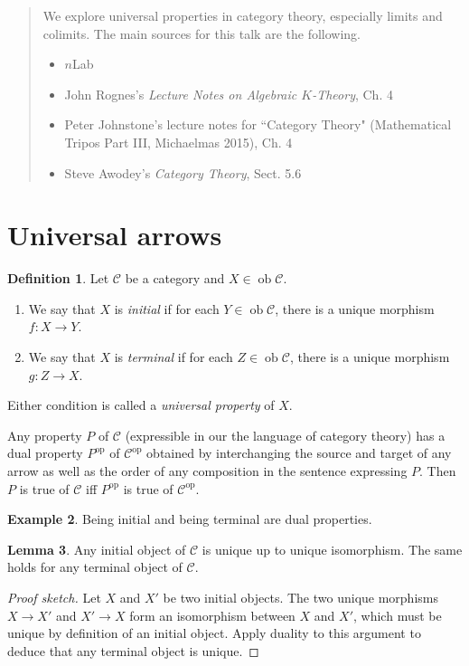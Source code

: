 \documentclass[10pt,letterpaper,cm]{nupset}
\theoremstyle{definition}
\newtheorem{definition}{Definition}[section]
\newtheorem{exmp}[definition]{Example}
\theoremstyle{theorem}
\newtheorem{lemma}[definition]{Lemma}
\theoremstyle{remark}
\newcommand{\1}{\mathbf{1}}
\renewcommand{\c}{\mathscr{C}}
\newcommand{\0}{\vec 0}
\DeclareMathOperator{\op}{op}
\DeclareMathOperator{\ob}{ob}
\begin{document}
\begin{abstract}
We explore universal properties in category theory, especially limits and colimits. The main sources for this talk are the following.
\begin{itemize}
\item $n$Lab
\item John Rognes's \textit{Lecture Notes on Algebraic $K$-Theory}, Ch. 4
\item Peter Johnstone's lecture notes for ``Category Theory" (Mathematical Tripos Part III, Michaelmas 2015), Ch. 4
\item Steve Awodey's \textit{Category Theory}, Sect. 5.6
\end{itemize}
\end{abstract}

\smallskip

\section{Universal arrows}

\begin{definition} Let $\c$ be a category and $X\in \ob{\c}$.
\begin{enumerate}
\item We say that $X$ is \textit{initial} if for each $Y \in \ob \c$, there is a unique morphism $f : X \to Y$. 
\item We say that $X$ is \textit{terminal} if for each $Z \in \ob \c$, there is a unique morphism $g : Z \to X$. 
\end{enumerate}

Either condition is called a \textit{universal property} of $X$.
\end{definition}


Any property $P$ of $\c$ (expressible in our the language of category theory) has a dual property $P^{\op}$ of $\c^{\op}$ obtained by interchanging the source and target of any arrow as well as the order of any composition in the sentence expressing $P$. Then $P$ is true of $\c$ iff $P^{\op}$ is true of $\c^{\op}$.


\begin{exmp}
Being initial and being terminal are dual properties.
\end{exmp}

\begin{lemma}\label{initial}
Any initial object of $\c$ is unique up to unique isomorphism. The same holds for any terminal object of $\c$.
\end{lemma}
\begin{proof}[Proof sketch]
Let $X$ and $X'$ be two initial objects. The two unique morphisms $X\to X'$ and $X'\to X$ form an isomorphism between $X$ and $X'$, which must be unique by definition of an initial object. Apply duality to this argument to deduce that any terminal object is unique.
\end{proof}
\end{document}

